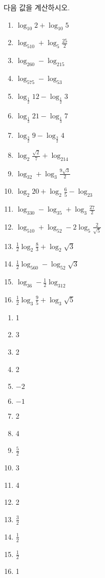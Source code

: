 \documentclass[a4paper]{oblivoir}
\begin{document}
\begin{Exercise}
다음 값을 계산하시오.
\begin{enumerate}[(1)]
\item
\(\log_{10}2+\log_{10}5\)
\item
\(\log_510+\log_5\frac{25}2\)
\item
\(\log_260-\log_215\)
\item
\(\log_575-\log_53\)
\item
\(\log_{\frac12}12-\log_{\frac12}3\)
\item
\(\log_{\frac13}21-\log_{\frac13}7\)
\item
\(\log_{\frac32}9-\log_{\frac32}4\)
\item
\(\log_2{\frac{\sqrt2}7}+\log_214\)
\item
\(\log_32+\log_3\frac{9\sqrt3}2\)
\item
\(\log_2{20}+\log_2\frac65-\log_23\)
\item
\(\log_330-\log_35+\log_3\frac{27}2\)
\item
\(\log_510+\log_52-2\log_5\frac2{\sqrt5}\)
\item
\(\frac12\log_2\frac83+\log_2\sqrt3\)
\item
\(\frac12\log_560-\log_52\sqrt3\)
\item
\(\log_36-\frac12\log_312\)
\item
\(\frac12\log_3\frac95+\log_3\sqrt5\)
\end{enumerate}
\end{Exercise}

\begin{Answer}
\begin{enumerate}[(1)]
\item
1
\item
3
\item
2
\item
2
\item
\(-2\)
\item
\(-1\)
\item
2
\item
4
\item
\(\frac52\)
\item
3
\item
4
\item
2
\item
\(\frac32\)
\item
\(\frac12\)
\item
\(\frac12\)
\item
1
\end{enumerate}
\end{Answer}
\end{document}

